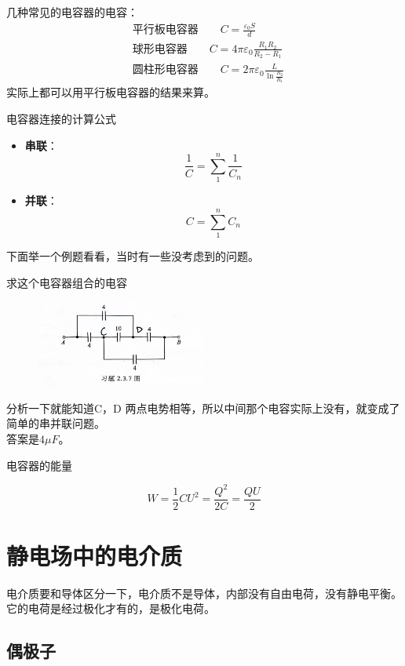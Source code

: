 \documentclass[cn,hazy,blue,14pt,normal]{elegantnote}
\numberwithin{equation}{section}
\begin{document}
几种常见的电容器的电容：
\begin{align}
	&\text{平行板电容器}\qquad
	C = \frac{\varepsilon_0S}{d}\\
	&\text{球形电容器}\qquad
	C = 4\pi\varepsilon_0\frac{R_1R_2}{R_2-R_1}\\
	&\text{圆柱形电容器}\qquad
	C = 2\pi\varepsilon_0\frac{L}{\ln\frac{R_2}{R_1}}
\end{align}
实际上都可以用平行板电容器的结果来算。\\
\begin{theorem}
	电容器连接的计算公式
\end{theorem}
\begin{itemize}
	\item \textbf{串联}：\begin{equation}\frac{1}{C}=\sum_{1}^{n}\frac{1}{C_n}\end{equation}
	\item \textbf{并联}：\begin{equation}C=\sum_{1}^{n}C_n\end{equation}
\end{itemize}
下面举一个例题看看，当时有一些没考虑到的问题。
\begin{example}
	求这个电容器组合的电容
\end{example}

\begin{figure}
	\includegraphics[width=0.5\textwidth]{image/电容器组合.jpg}
\end{figure}
分析一下就能知道C，D 两点电势相等，所以中间那个电容实际上没有，就变成了简单的串并联问题。\\
答案是$4\mu F$。
\begin{theorem}
	电容器的能量
\end{theorem}
\begin{equation}
	W = \frac{1}{2}CU^2 = \frac{Q^2}{2C} = \frac{QU}{2}
\end{equation}

\newpage
\section{静电场中的电介质}
电介质要和导体区分一下，电介质不是导体，内部没有自由电荷，没有静电平衡。\\
它的电荷是经过极化才有的，是极化电荷。
\newpage
\subsection{偶极子}
\end{document}
